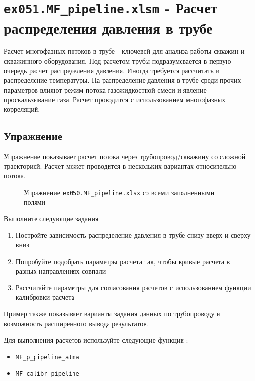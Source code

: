 \section{\texttt{ex051.MF_pipeline.xlsm} - Расчет распределения давления в трубе}
Расчет многофазных потоков в трубе - ключевой для анализа работы скважин и скважинного оборудования. Под расчетом трубы подразумевается в первую очередь расчет распределения давления. Иногда требуется рассчитать и распределение температуры. 
На распределение давления в трубе среди прочих параметров влияют режим потока газожидкостной смеси и явление проскальзывание газа. Расчет проводится с использованием многофазных корреляций. 

\subsection{Упражнение}
Упражнение показывает расчет потока через трубопровод/скважину со сложной траекторией. Расчет может проводится в нескольких вариантах относительно потока. 

\begin{figure}[h!]
	\center{\texttt{[image: Ex51\_1]}}
	\caption{Упражнение \texttt{ex050.MF_pipeline.xlsx} со всеми заполненными полями }
	\label{ris:Ex51_1}
\end{figure}

Выполните следующие задания
\begin{enumerate}
	\item Постройте зависимость распределение давления в трубе снизу вверх и сверху вниз
	 
	\item Попробуйте подобрать параметры расчета так, чтобы кривые расчета в разных направлениях совпали
	
	\item Рассчитайте параметры для согласования расчетов с использованием функции калибровки расчета
	
\end{enumerate}

Пример также показывает варианты задания данных по трубопроводу и возможность расширенного вывода результатов.

Для выполнения расчетов используйте следующие функции \unf{}:
\begin{itemize}
	
	\item \texttt{MF_p_pipeline_atma}
	\item \texttt{MF_calibr_pipeline}
\end{itemize}

